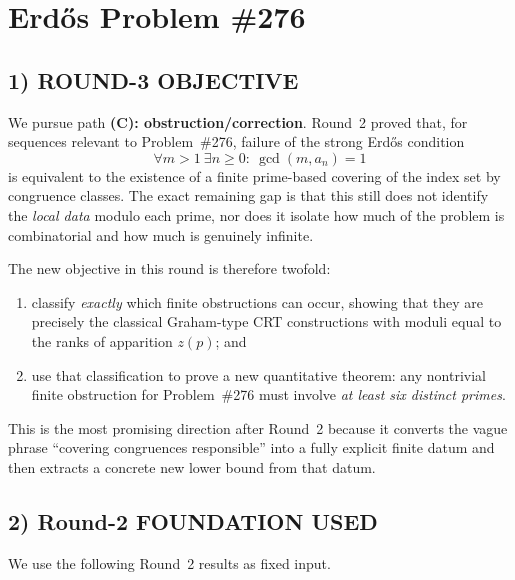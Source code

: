 \section*{Erd\H{o}s Problem \#276}

\subsection*{1) ROUND-3 OBJECTIVE}
We pursue path \textbf{(C): obstruction/correction}. Round~2 proved that, for sequences relevant to Problem~\#276, failure of the strong Erd\H{o}s condition
\[
\forall m>1\ \exists n\ge 0:\ \gcd(m,a_n)=1
\]
is equivalent to the existence of a finite prime-based covering of the index set by congruence classes. The exact remaining gap is that this still does not identify the \emph{local data} modulo each prime, nor does it isolate how much of the problem is combinatorial and how much is genuinely infinite.

The new objective in this round is therefore twofold:
\begin{enumerate}
\item classify \emph{exactly} which finite obstructions can occur, showing that they are precisely the classical Graham-type CRT constructions with moduli equal to the ranks of apparition $z(p)$; and
\item use that classification to prove a new quantitative theorem: any nontrivial finite obstruction for Problem~\#276 must involve \emph{at least six distinct primes}.
\end{enumerate}
This is the most promising direction after Round~2 because it converts the vague phrase ``covering congruences responsible'' into a fully explicit finite datum and then extracts a concrete new lower bound from that datum.

\subsection*{2) Round-2 FOUNDATION USED}
We use the following Round~2 results as fixed input.

